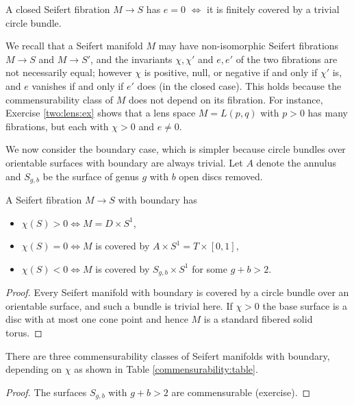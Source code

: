 \begin{cor}
A closed Seifert fibration $M\to S$ has $e=0$ $\Longleftrightarrow$ it is finitely covered by a trivial circle bundle.
\end{cor}

We recall that a Seifert manifold $M$ may have non-isomorphic Seifert fibrations $M\to S$ and $M\to S'$, and the invariants $\chi, \chi'$ and $e, e'$ of the two fibrations are not necessarily equal; however $\chi$ is positive, null, or negative if and only if $\chi'$ is, and $e$ vanishes if and only if $e'$ does (in the closed case). This holds because the commensurability class of $M$ does not depend on its fibration. For instance, Exercise \ref{two:lens:ex} shows that a lens space $M=L(p,q)$ with $p>0$ has many fibrations, but each with $\chi>0$ and $e\neq 0$.

We now consider the boundary case, which is simpler because circle bundles over orientable surfaces with boundary are always trivial. Let $A$ denote the annulus and $S_{g,b}$ be the surface of genus $g$ with $b$ open discs removed.

\begin{prop}
A Seifert fibration $M\to S$ with boundary has
\begin{itemize}
\item $\chi(S)>0 \Longleftrightarrow M = D\times S^1$,
\item $\chi(S)=0 \Longleftrightarrow M$ is covered by $A \times S^1 = T\times [0,1]$,
\item $\chi(S)<0 \Longleftrightarrow M$ is covered by $S_{g,b} \times S^1$ for some $g+b>2$.
\end{itemize}
\end{prop}
\begin{proof}
Every Seifert manifold with boundary is covered by a circle bundle over an orientable surface, and such a bundle is trivial here. If $\chi>0$ the base surface is a disc with at most one cone point and hence $M$ is a standard fibered solid torus. 
\end{proof}

\begin{cor} There are three commensurability classes of Seifert manifolds with boundary, depending on $\chi$ as shown in Table \ref{commensurability:table}.
\end{cor}
\begin{proof}
The surfaces $S_{g,b}$ with $g+b>2$ are commensurable (exercise).
\end{proof}

